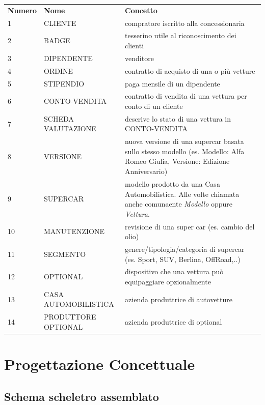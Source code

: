 \documentclass[11pt]{article}
\begin{document}
\begin{table}[htbp]
    \centering
    \small
    \begin{tabularx}{\linewidth}{l l X}
        \rowcolor{red!20!}
        \textbf{Numero} & \textbf{Nome} & \textbf{Concetto} \\
        1 & CLIENTE & compratore iscritto alla concessionaria \\
        2 & BADGE & tesserino utile al riconoscimento dei clienti \\
        3 & DIPENDENTE & venditore \\
        4 & ORDINE & contratto di acquisto di una o più vetture \\
        5 & STIPENDIO & paga mensile di un dipendente \\
        6 & CONTO-VENDITA & contratto di vendita di una vettura per conto
        di un cliente \\
        7 & SCHEDA VALUTAZIONE & descrive lo stato di una vettura in
        CONTO-VENDITA\\
        8 & VERSIONE & nuova versione di una supercar basata sullo stesso
        modello (es. Modello: Alfa Romeo Giulia, Versione: Edizione Anniversario) \\
        9 & SUPERCAR & modello prodotto da una Casa Automobilistica. Alle
        volte chiamata anche comunaente \textit{Modello} oppure \textit{Vettura}. \\
        10 & MANUTENZIONE & revisione di una super car (es. cambio del
        olio) \\
        11 & SEGMENTO & genere/tipologia/categoria di supercar (es. Sport, SUV, Berlina, OffRoad,..)\\
        12 & OPTIONAL & dispositivo che una vettura può equipaggiare
        opzionalmente \\
        13 & CASA AUTOMOBILISTICA & azienda produttrice di autovetture \\
        14 & PRODUTTORE OPTIONAL & azienda produttrice di optional \\
    \end{tabularx}
    \label{tab:tabella_linguaggio}
\end{table}

\section{Progettazione Concettuale}

\subsection{Schema scheletro assemblato}
\end{document}
